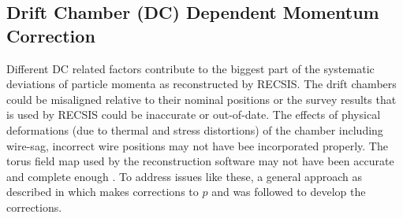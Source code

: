 
\subsection{Drift Chamber (DC) Dependent Momentum Correction} 

Different DC related factors contribute to the biggest part of the systematic deviations of particle momenta as reconstructed by RECSIS. The drift chambers could be misaligned relative to their nominal positions or the survey results that is used by RECSIS could be inaccurate or out-of-date. The effects of physical deformations (due to thermal and stress distortions) of the chamber including wire-sag, incorrect wire positions may not have bee incorporated properly. The torus field map used by the reconstruction software may not have been accurate and complete enough \cite{e6momcor_cn}. To address issues like these, a general approach as described in \cite{e6momcor_cn} which makes corrections to $p$ and \ths was followed to develop the corrections.


